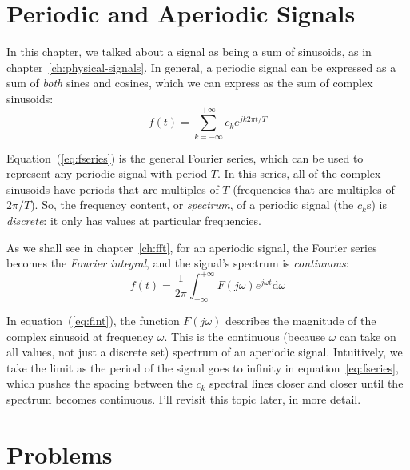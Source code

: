 \section{Periodic and Aperiodic Signals}

In this chapter, we talked about a signal as being a sum of sinusoids,
as in chapter~\ref{ch:physical-signals}. In general, a periodic
signal can be expressed as a sum of \emph{both} sines and cosines,
which we can express as the sum of complex sinusoids:
\begin{equation}
f(t) = \sum_{k=-\infty}^{+\infty} c_k e^{jk 2\pi t/T}
\label{eq:fseries}
\end{equation}

Equation~(\ref{eq:fseries}) is the general Fourier series, which can
be used to represent any periodic signal with period $T$. In this
series, all of the complex sinusoids have periods that are multiples
of $T$ (frequencies that are multiples of $2\pi/T$). So, the frequency
content, or \emph{spectrum}, of a periodic signal (the $c_k$s) is
\emph{discrete}: it only has values at particular frequencies.

As we shall see in chapter~\ref{ch:fft}, for an aperiodic signal, the
Fourier series becomes the \emph{Fourier integral}, and the signal's
spectrum is \emph{continuous}:
\begin{equation}
f(t) = \frac{1}{2\pi} \int_{-\infty}^{+\infty} F(j\omega)
                          e^{j\omega t} \mathrm{d}\omega
\label{eq:fint}
\end{equation}

In equation~(\ref{eq:fint}), the function $F(j\omega)$ describes the
magnitude of the complex sinusoid at frequency $\omega$.  This is the
continuous (because $\omega$ can take on all values, not just a
discrete set) spectrum of an aperiodic signal. Intuitively, we take the limit as the period of the signal goes to infinity in equation~\ref{eq:fseries}, which pushes the spacing between the $c_k$ spectral lines closer and closer until the spectrum becomes continuous. I'll revisit this
topic later, in more detail.

\section{Problems}

